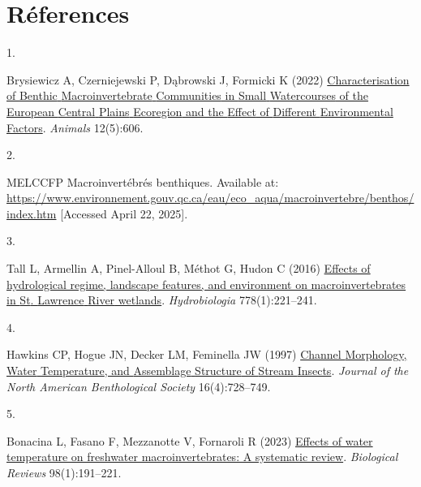 \documentclass[9pt,twocolumn,twoside,final]{pnas-new}
\newlength{\cslhangindent}
\newlength{\csllabelwidth}
\newenvironment{CSLReferences}[2] %
 {\begin{list}{}{%
  \setlength{\itemindent}{0pt}
  \setlength{\leftmargin}{0pt}
  \setlength{\parsep}{0pt}
  \ifodd #1
   \setlength{\leftmargin}{\cslhangindent}
   \setlength{\itemindent}{-1\cslhangindent}
  \fi
  \setlength{\itemsep}{#2\baselineskip}}}
 {\end{list}}
\newcommand{\CSLLeftMargin}[1]{\parbox[t]{\csllabelwidth}{#1}}
\newcommand{\CSLRightInline}[1]{\parbox[t]{\linewidth - \csllabelwidth}{#1}\break}
\begin{document}
\section*{Réferences}\label{references}

\showmatmethods
\showacknow
\pnasbreak

\label{refs}
\begin{CSLReferences}{0}{1}
\CSLLeftMargin{1. }%
\CSLRightInline{Brysiewicz A, Czerniejewski P, Dąbrowski J, Formicki K
(2022) \href{https://doi.org/10.3390/ani12050606}{Characterisation of
{Benthic} {Macroinvertebrate} {Communities} in {Small} {Watercourses} of
the {European} {Central} {Plains} {Ecoregion} and the {Effect} of
{Different} {Environmental} {Factors}}. \emph{Animals} 12(5):606.}

\CSLLeftMargin{2. }%
\CSLRightInline{MELCCFP Macroinvertébrés benthiques. Available at:
\url{https://www.environnement.gouv.qc.ca/eau/eco_aqua/macroinvertebre/benthos/index.htm}
{[}Accessed April 22, 2025{]}.}

\CSLLeftMargin{3. }%
\CSLRightInline{Tall L, Armellin A, Pinel-Alloul B, Méthot G, Hudon C
(2016) \href{https://doi.org/10.1007/s10750-015-2531-7}{Effects of
hydrological regime, landscape features, and environment on
macroinvertebrates in {St}. {Lawrence} {River} wetlands}.
\emph{Hydrobiologia} 778(1):221--241.}

\CSLLeftMargin{4. }%
\CSLRightInline{Hawkins CP, Hogue JN, Decker LM, Feminella JW (1997)
\href{https://doi.org/10.2307/1468167}{Channel {Morphology}, {Water}
{Temperature}, and {Assemblage} {Structure} of {Stream} {Insects}}.
\emph{Journal of the North American Benthological Society}
16(4):728--749.}

\CSLLeftMargin{5. }%
\CSLRightInline{Bonacina L, Fasano F, Mezzanotte V, Fornaroli R (2023)
\href{https://doi.org/10.1111/brv.12903}{Effects of water temperature on
freshwater macroinvertebrates: A systematic review}. \emph{Biological
Reviews} 98(1):191--221.}

\end{CSLReferences}



% 
\end{document}
